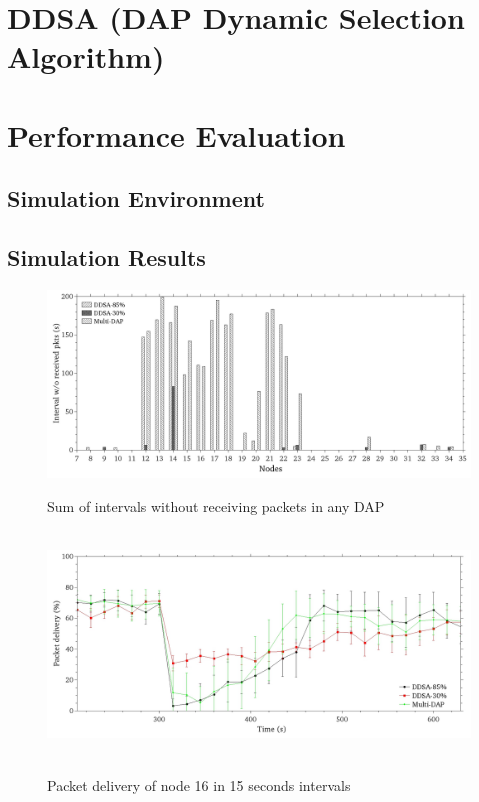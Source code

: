 \documentclass[conference]{IEEEtran}
\begin{document}
\section{DDSA (DAP Dynamic Selection Algorithm)}


\section{Performance Evaluation}

\subsection{Simulation Environment}  

\subsection{Simulation Results}


\begin{figure}[ht]
  \centering
  \label{intv-dap}{\includegraphics[scale=.21]{IEEE-consolidados/G-wo-rcv-pkt.jpg}} 
  \caption{Sum of intervals without receiving packets in any DAP}
  \label{sum-intv}
\end{figure}


\begin{figure}[ht]
  \centering
  \mbox{
    \label{pdf-n16-per}{\includegraphics[scale=.21]{IEEE-consolidados/G-pdf-periodo-n16.jpg}}
  }
  \caption{Packet delivery of node 16 in 15 seconds intervals}
  \label{pdf-n16-per}
\end{figure}
\end{document}
